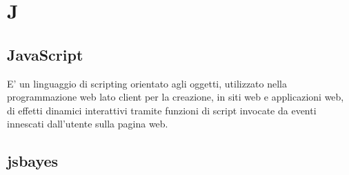 \section*{J}

\subsection{JavaScript}
E' un linguaggio di scripting orientato agli oggetti, utilizzato nella programmazione web lato client per la creazione, in siti web e 
applicazioni web, di effetti dinamici interattivi tramite funzioni di script invocate da eventi innescati dall'utente sulla pagina web.

\subsection{jsbayes}